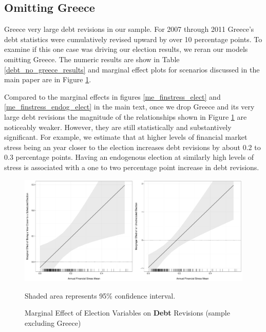 \documentclass[]{article}
\begin{document}
\subsection*{Omitting Greece}

Greece very large debt revisions in our sample. For 2007 through 2011 Greece's debt statistics were cumulatively revised upward by over 10 percentage points. To examine if this one case was driving our election results, we reran our models omitting Greece. The numeric results are show in Table \ref{debt_no_greece_results} and marginal effect plots for scenarios discussed in the main paper are in Figure \ref{me_no_greece}.

Compared to the marginal effects in figures \ref{me_finstress_elect} and \ref{me_finstress_endog_elect} in the main text, once we drop Greece and its very large debt revisions the magnitude of the relationships shown in Figure \ref{me_no_greece} are noticeably weaker. However, they are still statistically and substantively significant. For example, we estimate that at higher levels of financial market stress being an year closer to the election increases debt revisions by about 0.2 to 0.3 percentage points. Having an endogenous election at similarly high levels of stress is associated with a one to two percentage point increase in debt revisions.



\begin{figure}
    \caption{Marginal Effect of Election Variables on \textbf{Debt} Revisions (sample excluding Greece)}
    \label{me_no_greece}

    \begin{center}
        \includegraphics[scale=0.4]{figures/debt_me_nogreece.pdf}
    \end{center}

	{\scriptsize{Shaded area represents 95\% confidence interval.}}

\end{figure}
\end{document}
